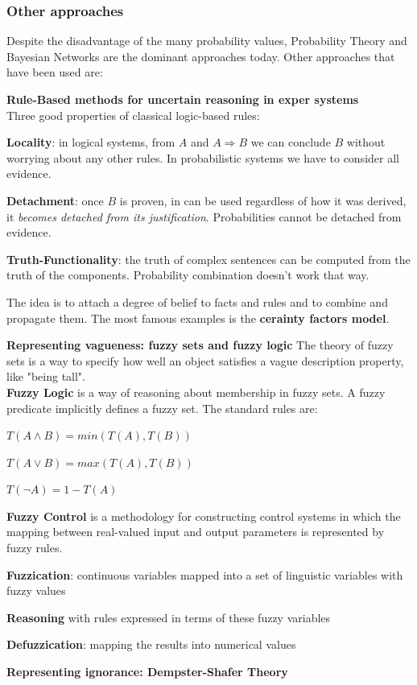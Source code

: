 \documentclass[10pt]{report}
\begin{document}
\subsubsection{Other approaches}
Despite the disadvantage of the many probability values, Probability Theory and Bayesian Networks are the dominant approaches today. Other approaches that have been used are:
\begin{list}{}{}
	\item \textbf{Rule-Based methods for uncertain reasoning in exper systems}\\
	Three good properties of classical logic-based rules:
	\begin{list}{}{}
		\item \textbf{Locality}: in logical systems, from $A$ and $A\Rightarrow B$ we can conclude $B$ without worrying about any other rules. In probabilistic systems we have to consider all evidence.
		\item \textbf{Detachment}: once $B$ is proven, in can be used regardless of how it was derived, it \textit{becomes detached from its justification}. Probabilities cannot be detached from evidence.
		\item \textbf{Truth-Functionality}: the truth of complex sentences can be computed from the truth of the components. Probability combination doesn't work that way.
	\end{list}
	The idea is to attach a degree of belief to facts and rules and to combine and propagate them. The most famous examples is the \textbf{cerainty factors model}.
	\item \textbf{Representing vagueness: fuzzy sets and fuzzy logic}
		The theory of fuzzy sets is a way to specify how well an object satisfies a vague description property, like "being tall".\\
		\textbf{Fuzzy Logic} is a way of reasoning about membership in fuzzy sets. A fuzzy predicate implicitly defines a fuzzy set. The standard rules are:
		\begin{list}{}{}
			\item $T(A\wedge B) = min(T(A),T(B))$
			\item $T(A\vee B) = max(T(A),T(B))$
			\item $T(\neg A) = 1-T(A)$
		\end{list}
		\textbf{Fuzzy Control} is a methodology for constructing control systems in which the mapping between real-valued input and output parameters is represented by fuzzy rules.
		\begin{list}{}{}
			\item \textbf{Fuzzication}: continuous variables mapped into a set of linguistic variables with fuzzy values
			\item \textbf{Reasoning} with rules expressed in terms of these fuzzy variables
			\item \textbf{Defuzzication}: mapping the results into numerical values
		\end{list}
	\item \textbf{Representing ignorance: Dempster-Shafer Theory}
\end{list}
\end{document}
